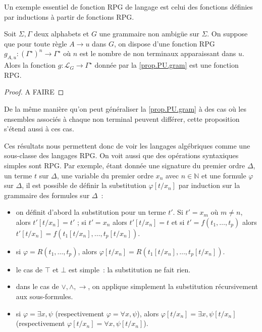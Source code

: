 Un exemple essentiel de fonction RPG de langage est celui des fonctions
définies par inductions à partir de fonctions RPG.

\begin{proposition}
  Soit $\Sigma,\Gamma$ deux alphabets et $G$ une grammaire non ambigüe sur
  $\Sigma$. On suppose que pour toute règle $A \to u$ dans $G$, on dispose d'une
  fonction RPG $g_{A,u} : (\Gamma^\star)^n \to \Gamma^\star$ où $n$ est le nombre
  de non terminaux apparaissant dans $u$. Alors la fonction
  $g : \mathcal L_G \to \Gamma^\star$ donnée par la \cref{prop.PU.gram} est une
  fonction RPG.
\end{proposition}

\begin{proof}
  A FAIRE
\end{proof}

\begin{remark}
  De la même manière qu'on peut généraliser la \cref{prop.PU.gram} à des cas
  où les ensembles associés à chaque non terminal peuvent différer, cette
  proposition s'étend aussi à ces cas.
\end{remark}

Ces résultats nous permettent donc de voir les langages algébriques comme une
sous-classe des langages RPG. On voit aussi que des opérations syntaxiques
simples sont RPG. Par exemple, étant donnée une signature du premier ordre
$\Delta$, un terme $t$ sur $\Delta$, une variable du premier ordre $x_n$ avec
$n \in \mathbb N$ et une formule $\varphi$ sur $\Delta$, il est possible de
définir la substitution $\varphi[t/x_n]$ par induction sur la grammaire des
formules sur $\Delta$~:
\begin{itemize}
\item on définit d'abord la substitution pour un terme $t'$. Si $t' = x_m$ où
  $m \neq n$, alors $t'[t/x_n] = t'$ ; si $t' = x_n$ alors $t'[t/x_n] = t$ et
  si $t' = f(t_1,\ldots,t_p)$ alors
  $t'[t/x_n] = f(t_1[t/x_n],\ldots,t_p[t/x_n])$.
\item si $\varphi = R(t_1,\ldots,t_p)$, alors
  $\varphi[t/x_n]=R(t_1[t/x_n],\ldots,t_p[t/x_n])$.
\item le cas de $\top$ et $\bot$ est simple~: la substitution ne fait rien.
\item dans le cas de $\lor,\land,\to$, on applique simplement la substitution
  récursivement aux sous-formules.
\item si $\varphi = \exists x,\psi$ (respectivement
  $\varphi = \forall x, \psi$), alors $\varphi[t/x_n] = \exists x, \psi[t/x_n]$
  (respectivement $\varphi[t/x_n] = \forall x, \psi[t/x_n]$).
\end{itemize}

